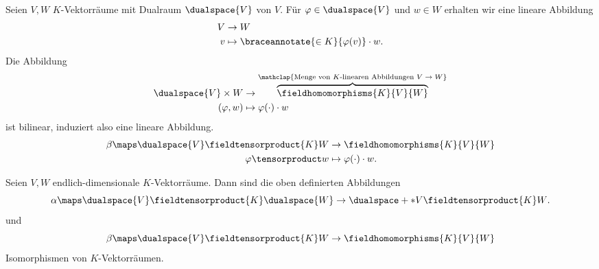 \begin{bemerkung*}
  Seien \( V,W \) \( K \)-Vektorräume mit Dualraum \( \dualspace{V} \) von \( V \). Für \( \varphi\in \dualspace{V} \) und \( w\in W \) erhalten wir eine lineare Abbildung
  \begin{align*}
    V&\to W\\
    v&\mapsto \braceannotate{\in K}{\varphi(v)}\cdot w.
  \end{align*}
  Die Abbildung
  \begin{align*}
    \dualspace{V}\times W&\to \overbrace{\fieldhomomorphisms{K}{V}{W}}^{\mathclap{\text{Menge von \( K \)-linearen Abbildungen \( V\to W \)}}}\\
    (\varphi,w)&\mapsto \varphi(\cdot)\cdot w
  \end{align*}
  ist bilinear, induziert also eine lineare Abbildung.
  \begin{align*}
    \beta\maps \dualspace{V}\fieldtensorproduct{K}W&\to \fieldhomomorphisms{K}{V}{W}\\
    \varphi\tensorproduct w&\mapsto \varphi(\cdot)\cdot w.
  \end{align*}
\end{bemerkung*}
\begin{satz}
  Seien \( V,W \) endlich-dimensionale \( K \)-Vektorräume. Dann sind die oben definierten Abbildungen
  \begin{equation*}
    \alpha\maps \dualspace{V}\fieldtensorproduct{K}\dualspace{W}\to \dualspace+*{V\fieldtensorproduct{K}W}.
  \end{equation*}
  und
  \begin{equation*}
    \beta\maps \dualspace{V}\fieldtensorproduct{K}W\to \fieldhomomorphisms{K}{V}{W}
  \end{equation*}
  Isomorphismen von \( K \)-Vektorräumen.
\end{satz}
